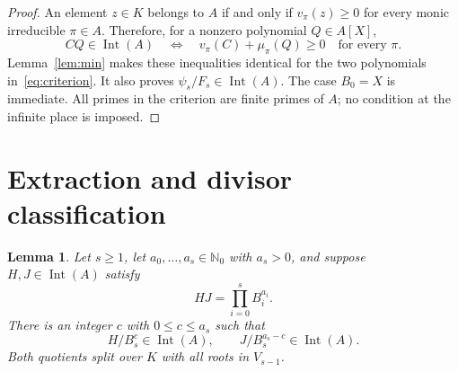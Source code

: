 \documentclass[11pt]{article}
\newtheorem{lemma}[theorem]{Lemma}
\theoremstyle{remark}
\newcommand{\Int}{\operatorname{Int}}
\newcommand{\Nzero}{\mathbb N_0}
\begin{document}
\begin{proof}
An element $z\in K$ belongs to $A$ if and only if $v_\pi(z)\geq0$ for every monic irreducible $\pi\in A$. Therefore, for a nonzero polynomial $Q\in A[X]$,
\[
 CQ\in\Int(A)
 \quad\Longleftrightarrow\quad
 v_\pi(C)+\mu_\pi(Q)\geq0\quad\text{for every }\pi.
\]
Lemma~\ref{lem:min} makes these inequalities identical for the two polynomials in~\eqref{eq:criterion}. It also proves $\psi_s/F_s\in\Int(A)$. The case $B_0=X$ is immediate. All primes in the criterion are finite primes of $A$; no condition at the infinite place is imposed.
\end{proof}

\section{Extraction and divisor classification}

\begin{lemma}\label{lem:extract}
Let $s\geq1$, let $a_0,\ldots,a_s\in\Nzero$ with $a_s>0$, and suppose $H,J\in\Int(A)$ satisfy
\[
 HJ=\prod_{i=0}^sB_i^{a_i}.
\]
There is an integer $c$ with $0\leq c\leq a_s$ such that
\[
 H/B_s^c\in\Int(A),\qquad
 J/B_s^{a_s-c}\in\Int(A).
\]
Both quotients split over $K$ with all roots in $V_{s-1}$.
\end{lemma}
\end{document}
